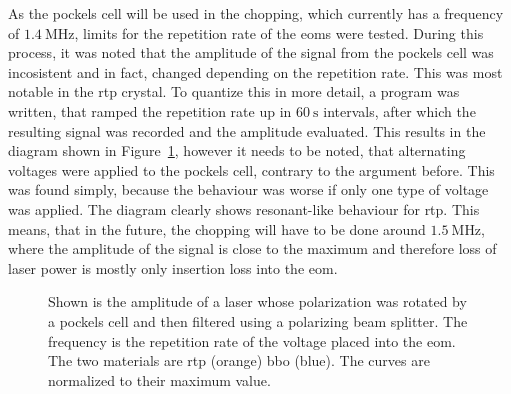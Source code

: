 As the pockels cell will be used in the chopping, which currently has a frequency of $\SI{1.4}{\mega\hertz}$, limits for the repetition rate of the \acp{eom} were tested. During this process, it was noted that the amplitude of the signal from the pockels cell was incosistent and in fact, changed depending on the repetition rate. This was most notable in the \ac{rtp} crystal. To quantize this in more detail, a program was written, that ramped the repetition rate up in $\SI{60}{\second}$ intervals, after which the resulting signal was recorded and the amplitude evaluated. This results in the diagram shown in Figure~\ref{fig:eom_amp_time}, however it needs to be noted, that alternating voltages were applied to the pockels cell, contrary to the argument before. This was found simply, because the behaviour was worse if only one type of voltage was applied. The diagram clearly shows resonant-like behaviour for \ac{rtp}. This means, that in the future, the chopping will have to be done around $\SI{1.5}{\mega\hertz}$, where the amplitude of the signal is close to the maximum and therefore loss of laser power is mostly only insertion loss into the \ac{eom}.

\begin{figure}[t]%
\label{fig:eom_amp_time}
\caption{Shown is the amplitude of a laser whose polarization was rotated by a pockels cell and then filtered using a polarizing beam splitter. The frequency is the repetition rate of the voltage placed into the \ac{eom}. The two materials are \ac{rtp} (orange) \ac{bbo} (blue). The curves are normalized to their maximum value.}
\end{figure}

